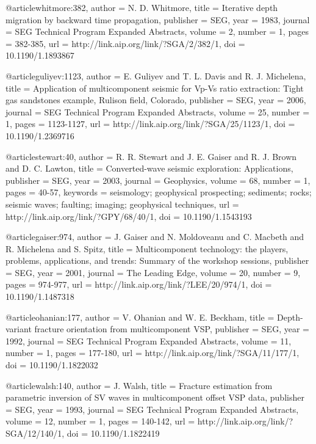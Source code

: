 {@article{whitmore:382,
  author =	 {N. D. Whitmore},
  title =	 {Iterative depth migration by backward time
                  propagation},
  publisher =	 {SEG},
  year =	 1983,
  journal =	 {SEG Technical Program Expanded Abstracts},
  volume =	 2,
  number =	 1,
  pages =	 {382-385},
  url =		 {http://link.aip.org/link/?SGA/2/382/1},
  doi =		 {10.1190/1.1893867}
}

@article{guliyev:1123,
  author =	 {E. Guliyev and T. L. Davis and R.
                  J. Michelena},
  title =	 {Application of multicomponent seismic for Vp-Vs
                  ratio extraction: Tight gas sandstones example,
                  Rulison field, Colorado},
  publisher =	 {SEG},
  year =	 2006,
  journal =	 {SEG Technical Program Expanded Abstracts},
  volume =	 25,
  number =	 1,
  pages =	 {1123-1127},
  url =		 {http://link.aip.org/link/?SGA/25/1123/1},
  doi =		 {10.1190/1.2369716}
}

@article{stewart:40,
  author =	 {R. R. Stewart and J. E. Gaiser and R. J.
                  Brown and D. C. Lawton},
  title =	 {Converted-wave seismic exploration: Applications},
  publisher =	 {SEG},
  year =	 2003,
  journal =	 {Geophysics},
  volume =	 68,
  number =	 1,
  pages =	 {40-57},
  keywords =	 {seismology; geophysical prospecting; sediments;
                  rocks; seismic waves; faulting; imaging; geophysical
                  techniques},
  url =		 {http://link.aip.org/link/?GPY/68/40/1},
  doi =		 {10.1190/1.1543193}
}

@article{gaiser:974,
  author =	 {J. Gaiser and N. Moldoveanu and C. Macbeth
                  and R. Michelena and S. Spitz},
  title =	 {Multicomponent technology: the players, problems,
                  applications, and trends: Summary of the workshop
                  sessions},
  publisher =	 {SEG},
  year =	 2001,
  journal =	 {The Leading Edge},
  volume =	 20,
  number =	 9,
  pages =	 {974-977},
  url =		 {http://link.aip.org/link/?LEE/20/974/1},
  doi =		 {10.1190/1.1487318}
}

@article{ohanian:177,
  author =	 {V. Ohanian and W. E. Beckham},
  title =	 {Depth-variant fracture orientation from
                  multicomponent VSP},
  publisher =	 {SEG},
  year =	 1992,
  journal =	 {SEG Technical Program Expanded Abstracts},
  volume =	 11,
  number =	 1,
  pages =	 {177-180},
  url =		 {http://link.aip.org/link/?SGA/11/177/1},
  doi =		 {10.1190/1.1822032}
}

@article{walsh:140,
  author =	 {J. Walsh},
  title =	 {Fracture estimation from parametric inversion of
                  {SV} waves in multicomponent offset VSP data},
  publisher =	 {SEG},
  year =	 1993,
  journal =	 {SEG Technical Program Expanded Abstracts},
  volume =	 12,
  number =	 1,
  pages =	 {140-142},
  url =		 {http://link.aip.org/link/?SGA/12/140/1},
  doi =		 {10.1190/1.1822419}
}

}
